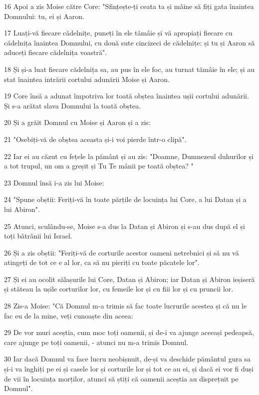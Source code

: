 \par 16 Apoi a zis Moise către Core: "Sfințește-ți ceata ta și mâine să fiți gata înaintea Domnului: tu, ei și Aaron.
\par 17 Luați-vă fiecare cădelnițe, puneți în ele tămâie și vă apropiați fiecare cu cădelnița înaintea Domnului, cu două sute cincizeci de cădelnițe: și tu și Aaron să aduceți fiecare cădelnița voastră".
\par 18 Și și-a luat fiecare cădelnița sa, au pus în ele foc, au turnat tămâie în ele; și au stat înaintea intrării cortului adunării Moise și Aaron.
\par 19 Core însă a adunat împotriva lor toată obștea înaintea ușii cortului adunării. Și s-a arătat slava Domnului la toată obștea.
\par 20 Și a grăit Domnul cu Moise și Aaron și a zis:
\par 21 "Osebiți-vă de obștea aceasta și-i voi pierde într-o clipă".
\par 22 Iar ei au căzut cu fețele la pământ și au zis: "Doamne, Dumnezeul duhurilor și a tot trupul, un om a greșit și Tu Te mânii pe toată obștea? "
\par 23 Domnul însă i-a zis lui Moise:
\par 24 "Spune obștii: Feriți-vă în toate părțile de locuința lui Core, a lui Datan și a lui Abiron".
\par 25 Atunci, sculându-se, Moise s-a dus la Datan și Abiron și s-au dus după el și toți bătrânii lui Israel.
\par 26 Și a zis obștii: "Feriți-vă de corturile acestor oameni netrebnici și să nu vă atingeți de tot ce e al lor, ca să nu pieriți cu toate păcatele lor".
\par 27 Și ei au ocolit sălașurile lui Core, Datan și Abiron; iar Datan și Abiron ieșiseră și stăteau la ușile corturilor lor, cu femeile lor și cu fiii lor și cu pruncii lor.
\par 28 Zis-a Moise: "Că Domnul m-a trimis să fac toate lucrurile acestea și că nu le fac eu de la mine, veți cunoaște din aceea:
\par 29 De vor muri aceștia, cum moc toți oamenii, și de-i va ajunge aceeași pedeapsă, care ajunge pe toți oamenii, - atunci nu m-a trimis Domnul.
\par 30 Iar dacă Domnul va face lucru neobișnuit, de-și va deschide pământul gura sa și-i va înghiți pe ei și casele lor și corturile lor și tot ce au ei, și dacă ei vor fi duși de vii în locuința morților, atunci să știți că oamenii aceștia au disprețuit pe Domnul".
